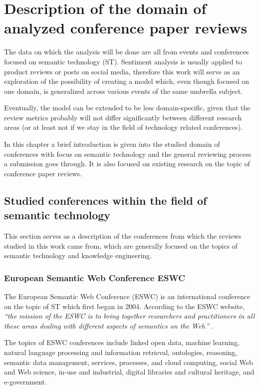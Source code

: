 \chapter{Description of the domain of analyzed conference paper reviews}
The data on which the analysis will be done are all from events and conferences focused on semantic technology (ST). Sentiment analysis is usually applied to product reviews or posts on social media, therefore this work will serve as an exploration of the possibility of creating a  model which, even though focused on one domain, is generalized  across various events of the same umbrella subject.

Eventually, the model can be extended to be less domain-specific, given that the review metrics probably will not differ significantly between different research areas (or at least not if we stay in the field of technology related conferences). 

In this chapter a brief introduction is given into the studied domain of conferences with focus on semantic technology and the general reviewing process a submission goes through. It is also focused on existing research on the topic of conference paper reviews.

\section{Studied conferences within the field of semantic technology}
This section serves as a description of the conferences from which the reviews studied in this work came from, which are generally focused on the topics of semantic technology and knowledge engineering.
\subsection{European Semantic Web Conference ESWC}
The European Semantic Web Conference (ESWC) is an international conference on the topic of ST which first began in 2004.
According to the ESWC website, \textit{``the mission of the ESWC is to bring together researchers and practitioners in all these areas dealing with different aspects of semantics on the Web.''} \cite{eswc}.

The topics of ESWC conferences include linked open data, machine learning, natural language processing and information retrieval, ontologies, reasoning, semantic data management, services, processes, and cloud computing, social Web and Web science, in-use and industrial, digital libraries and cultural heritage, and e-government. \cite{eswc_topics}

